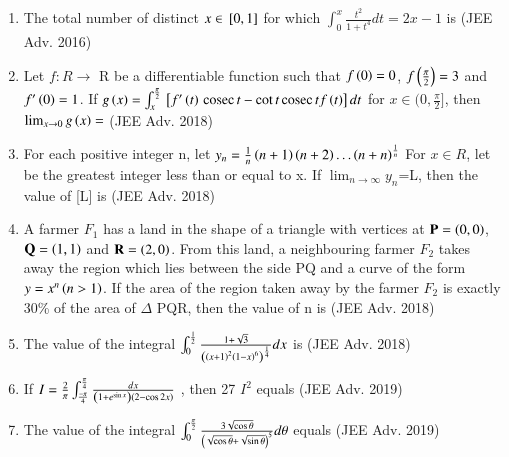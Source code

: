 \documentclass[journal,12pt,onecolumn]{IEEEtran}
\theoremstyle{remark}
\begin{document}
\begin{enumerate}
\item The total number of distinct $x\in{}\left[0,1\right]$ for which $\int_{0}^{x}\frac{t^2}{1+t^4}dt=2x-1$ is \hfill{(JEE Adv. 2016)}

\item Let $f:R\rightarrow$ R be a differentiable function such that $f\left(0\right)=0$, $f\left(\frac{\pi}{2}\right)=3$ and $f^\prime\left(0\right)=1$. If $g\left(x\right)=\int_{x}^{\frac{\pi}{2}}{}\left[f^\prime\left(t\right)\,\text{cosec}\, t -\cot t\,\text{cosec}\, tf\left(t\right)\right]dt$ for $x\in \bigg(0,\frac{\pi}{2}\biggr]$, then $\lim_{x\to 0} g\left(x\right)= $   \hfill{(JEE Adv. 2018)}

\item For each positive integer n, let $y_n =\frac{1}{n}\left(n+1\right)\left(n+2\right)\dots\left(n+n\right)^{\frac{1}{n}}$ For $x \in R$, let  be the greatest integer less than  or equal to x. If $\lim_{n\to \infty} y_n$=L, then the value of [L] is \hfill{(JEE Adv. 2018)}

\item A farmer $F_1$ has a land in the shape of a triangle with vertices at $\mathbf{P}=\left(0,0\right)$,$\mathbf{Q}=\left(1,1\right)$ and $\mathbf{R}=\left(2,0\right)$. From this land, a neighbouring farmer $F_2$ takes away the region which lies between the side PQ and a curve of the form $y=x^n\left(n>1\right)$. If the area of the region taken away by the farmer $F_2$ is exactly 30\% of the area of $\Delta$ PQR, then the value of n is \hfill{(JEE Adv. 2018)} 

\item The value of the integral $\int_{0}^{\frac{1}{2}}\frac{1+\sqrt{3}}{\left(\left(x+1\right)^2\left(1-x\right)^6\right)^\frac{1}{4}}dx$ is \hfill{(JEE Adv. 2018)}

\item If $I=\frac{2}{\pi} \int_{\frac{-\pi}{4}}^{\frac{\pi}{4}} \frac{dx}{\left(1+e^{\sin x}\right)\left(2-\cos2x\right)}$ , then 27 $I^2$ equals \hfill{(JEE Adv. 2019)}

\item The value of the integral $\int_{0}^{\frac{\pi}{2}} \frac{3\sqrt{\cos\theta}}{\left(\sqrt{\cos\theta}+\sqrt{\sin\theta}\right)^5} d\theta$ equals \hfill{(JEE Adv. 2019)}
\end{enumerate}
\end{document}
